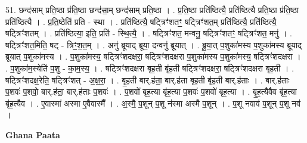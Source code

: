 \documentclass[17pt]{extarticle}
\begin{document}
51. छन्द॑साम् प्रति॒ष्ठा प्र॑ति॒ष्ठा छन्द॑सा॒म् छन्द॑साम् प्रति॒ष्ठा । . प्र॒ति॒ष्ठा प्रति॑ष्ठित्यै॒ प्रति॑ष्ठित्यै प्रति॒ष्ठा प्र॑ति॒ष्ठा प्रति॑ष्ठित्यै । . प्र॒ति॒ष्ठेति॑ प्रति - स्था । . प्रति॑ष्ठित्यै॒ षट्त्रिꣳ॑शतꣳ॒॒ षट्त्रिꣳ॑शत॒म् प्रति॑ष्ठित्यै॒ प्रति॑ष्ठित्यै॒ षट्त्रिꣳ॑शतम् । . प्रति॑ष्ठित्या॒ इति॒ प्रति॑ - स्थि॒त्यै॒ । . षट्त्रिꣳ॑शत॒ मन्वनु॒ षट्त्रिꣳ॑शतꣳ॒॒ षट्त्रिꣳ॑शत॒ मनु॑ । . षट्त्रिꣳ॑शत॒मिति॒ षट् - त्रिꣳ॒॒श॒त॒म् । . अनु॑ ब्रूयाद् ब्रूया॒ दन्वनु॑ ब्रूयात् । . ब्रू॒या॒त् प॒शुका॑मस्य प॒शुका॑मस्य ब्रूयाद् ब्रूयात् प॒शुका॑मस्य । . प॒शुका॑मस्य॒ षट्त्रिꣳ॑शदक्षरा॒ षट्त्रिꣳ॑शदक्षरा प॒शुका॑मस्य प॒शुका॑मस्य॒ षट्त्रिꣳ॑शदक्षरा । . प॒शुका॑म॒स्येति॑ प॒शु - का॒म॒स्य॒ । . षट्त्रिꣳ॑शदक्षरा बृह॒ती बृ॑ह॒ती षट्त्रिꣳ॑शदक्षरा॒ षट्त्रिꣳ॑शदक्षरा बृह॒ती । . षट्त्रिꣳ॑शदक्ष॒रेति॒ षट्त्रिꣳ॑शत् - अ॒क्ष॒रा॒ । . बृ॒ह॒ती बार्.ह॑ता॒ बार्.ह॑ता बृह॒ती बृ॑ह॒ती बार्.ह॑ताः । . बार्.ह॑ताः प॒शवः॑ प॒शवो॒ बार्.ह॑ता॒ बार्.ह॑ताः प॒शवः॑ । . प॒शवो॑ बृह॒त्या बृ॑ह॒त्या प॒शवः॑ प॒शवो॑ बृह॒त्या । . बृ॒ह॒त्यैवैव बृ॑ह॒त्या बृ॑ह॒त्यैव । . ए॒वास्मा॑ अस्मा ए॒वैवास्मै᳚ । . अ॒स्मै॒ प॒शून् प॒शू न॑स्मा अस्मै प॒शून् । . प॒शू नवाव॑ प॒शून् प॒शू नव॑ । \newline

\textbf{Ghana Paata } \newline
\end{document}
